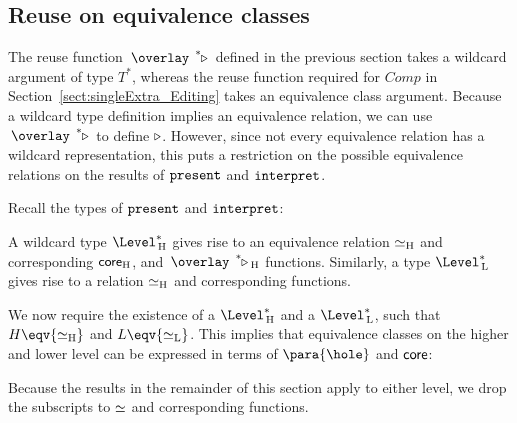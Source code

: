 \subsection{Reuse on equivalence classes}

The reuse function $\reuzestar$ defined in the previous section takes a wildcard argument of type $T^*$, whereas the reuse function required for $Comp$ in Section~\ref{sect:singleExtra_Editing} takes an equivalence class argument. Because a wildcard type definition implies an equivalence relation, we can use $\reuzestar$ to define $\triangleright$. However, since not every equivalence relation has a wildcard representation, this puts a restriction on the possible equivalence relations on the results of ${\tt present}$ and ${\tt interpret}$.

Recall the types of ${\tt present}$ and ${\tt interpret}$:



A wildcard type $\Level^*\H$ gives rise to an equivalence relation $\simeq_{\rm H}$ and corresponding ${\mathsf {core}}_{\rm H}$, and $\reuzestar_{\rm H}$ functions. Similarly, a type $\Level^*\L$ gives rise to a relation $\simeq_{\rm H}$ and corresponding functions. 

We now require the existence of a $\Level^*\H$ and a $\Level^*\L$, such that $H \eqv {\eqstar_{\rm H}}$ and
$L \eqv {\eqstar_{\rm L}}$. This implies that equivalence classes on the higher and lower level can be expressed in terms of $\para{\hole}$ and ${\mathsf {core}}$:


Because the results in the remainder of this section apply to either level, we drop the subscripts to $\simeq$ and corresponding functions.



